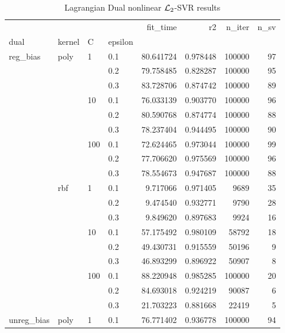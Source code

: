 \begin{table}[H]
\centering
\caption{Lagrangian Dual nonlinear $\protect \mathcal{L}_2$-SVR results}
\label{nonlinear_lagrangian_dual_l2_svr_cv_results}
\begin{tabular}{llllrrrr}
\toprule
           &     &     &     &   fit\_time &        r2 &  n\_iter &  n\_sv \\
dual & kernel & C & epsilon &            &           &         &       \\
\midrule
reg\_bias & poly & 1   & 0.1 &  80.641724 &  0.978448 &  100000 &    97 \\
           &     &     & 0.2 &  79.758485 &  0.828287 &  100000 &    95 \\
           &     &     & 0.3 &  83.728706 &  0.874742 &  100000 &    89 \\
           &     & 10  & 0.1 &  76.033139 &  0.903770 &  100000 &    96 \\
           &     &     & 0.2 &  80.590768 &  0.874774 &  100000 &    88 \\
           &     &     & 0.3 &  78.237404 &  0.944495 &  100000 &    90 \\
           &     & 100 & 0.1 &  72.624465 &  0.973044 &  100000 &    99 \\
           &     &     & 0.2 &  77.706620 &  0.975569 &  100000 &    96 \\
           &     &     & 0.3 &  78.554673 &  0.947687 &  100000 &    88 \\
           & rbf & 1   & 0.1 &   9.717066 &  0.971405 &    9689 &    35 \\
           &     &     & 0.2 &   9.474540 &  0.932771 &    9790 &    28 \\
           &     &     & 0.3 &   9.849620 &  0.897683 &    9924 &    16 \\
           &     & 10  & 0.1 &  57.175492 &  0.980109 &   58792 &    18 \\
           &     &     & 0.2 &  49.430731 &  0.915559 &   50196 &     9 \\
           &     &     & 0.3 &  46.893299 &  0.896922 &   50907 &     8 \\
           &     & 100 & 0.1 &  88.220948 &  0.985285 &  100000 &    20 \\
           &     &     & 0.2 &  84.693018 &  0.924219 &   90087 &     6 \\
           &     &     & 0.3 &  21.703223 &  0.881668 &   22419 &     5 \\
unreg\_bias & poly & 1   & 0.1 &  76.771402 &  0.936778 &  100000 &    94 \\

\end{tabular}
\end{table}
